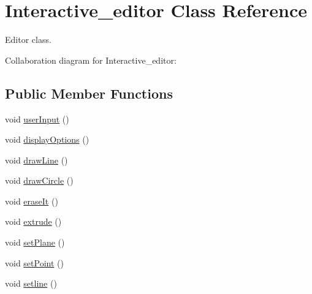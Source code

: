 \hypertarget{classInteractive__editor}{}\section{Interactive\+\_\+editor Class Reference}
\label{classInteractive__editor}


Editor class.  




Collaboration diagram for Interactive\+\_\+editor\+:
\subsection*{Public Member Functions}
\begin{DoxyCompactItemize}
\item 
void \hyperlink{classInteractive__editor_aa7d472e169eed213d1fcb874c6f5a6cd}{user\+Input} ()
\item 
void \hyperlink{classInteractive__editor_a8078ec1404bdd80e09320d14d198f628}{display\+Options} ()
\item 
void \hyperlink{classInteractive__editor_a30310b574f37f50f7d40e2acebf93723}{draw\+Line} ()
\item 
void \hyperlink{classInteractive__editor_a630465bba8474cf03efb3e0716009e1f}{draw\+Circle} ()
\item 
void \hyperlink{classInteractive__editor_a29bd8d4ac9bff675360a661ab9f04db4}{erase\+It} ()
\item 
void \hyperlink{classInteractive__editor_a6543fe863fa4a902fb4dd71cf6318533}{extrude} ()
\item 
void \hyperlink{classInteractive__editor_a1332966f87d6df07b217ed663105379b}{set\+Plane} ()
\item 
void \hyperlink{classInteractive__editor_a21c3f807f2e892c9b40cae987593e2cb}{set\+Point} ()
\item 
void \hyperlink{classInteractive__editor_acf3e55ad6b947af72b83d996f409c176}{setline} ()
\end{DoxyCompactItemize}
